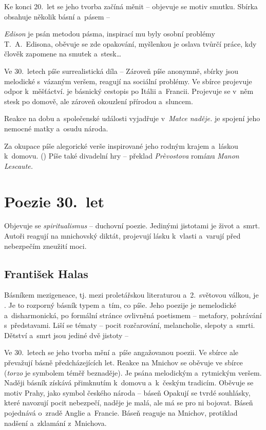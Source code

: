Ke konci 20.~let se jeho tvorba začíná měnit -- objevuje se motiv
smutku. Sbírka  obsahuje několik básní a~pásem --
 

\emph{Edison} je psán metodou pásma, inspirací mu byly osobní problémy
T.~A.~Edisona, oběvuje se zde opakování, myšlenkou je oslava tvůrčí
práce, kdy člověk zapomene na smutek a~stesk\dots{}

Ve 30.~letech píše surrealistická díla -- 
  Zároveň píše
anonymně, sbírky jsou melodické s~vázaným veršem, reagují na sociální
problémy. Ve sbírce  projevuje odpor k~měšťáctví.  je básnický
cestopis po Itálii a~Francii. Projevuje se v~něm stesk po domově, ale
zároveň okouzlení přírodou a~sluncem.

Reakce na dobu a~společenské události vyjadřuje v~\emph{Matce naděje.}
 je spojení jeho nemocné matky a~osudu národa.

Za okupace píše alegorické verše inspirované jeho rodným krajem a~láskou
k~domovu. () Píše také divadelní hry --
 překlad \emph{Pr\`evostova} románu \emph{Manon
Lescaute.} 

\section{Poezie 30.~let}
Objevuje se \emph{spiritualismus} -- duchovní poezie. Jedinými jistotami
je život a~smrt. Autoři reagují na mnichovský diktát, projevují lásku
k~vlasti a~varují před nebezpečím zneužití moci.
\subsection*{František Halas} 
Básníkem mezigeneace, tj. mezi proletářskou literaturou a~2.~světovou
válkou, je . Je to rozporný básník typem a~tím,
co píše. Jeho poezije je nemelodické a~disharmonická, po formální
stránce ovlivněná poetismem -- metafory, pohrávání s~představami.
Liší se tématy -- pocit rozčarování, melancholie, slepoty a~smrti.
Dětství a~smrt jsou jediné dvě jistoty -- 

Ve 30.~letech se jeho tvorba mění a~píše angažovanou poezii. Ve sbírce
 ale převažují básně předcházejících let. Reakce na
Mnichov se oběvuje ve sbírce  (\emph{torzo} je
symbolem téměř beznaděje). Je psána melodickým a~rytmickým veršem.
Naději básník získává přimknutím k~domovu a~k~českým tradicím. Oběvuje
se motiv Prahy, jako symbol českého národa -- báseň 
Opakují se tvrdé souhlásky, které navozují pocit nebezpečí, naděje je
malá, ale má se pro ni bojovat. Báseň  pojednává
o~zradě Anglie a~Francie. Báseň  reaguje na Mnichov,
protiklad nadšení a~zklamání z~Mnichova.

